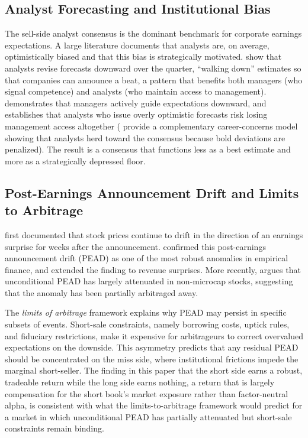 \documentclass[11pt]{article}
\begin{document}
\subsection{Analyst Forecasting and Institutional Bias}

The sell-side analyst consensus is the dominant benchmark for corporate earnings expectations. A large literature documents that analysts are, on average, optimistically biased and that this bias is strategically motivated. \citet{richardson2004walk} show that analysts revise forecasts downward over the quarter, ``walking down'' estimates so that companies can announce a beat, a pattern that benefits both managers (who signal competence) and analysts (who maintain access to management). \citet{matsumoto2002management} demonstrates that managers actively guide expectations downward, and \citet{ke2006effect} establishes that analysts who issue overly optimistic forecasts risk losing management access altogether (\citet{hong2000security} provide a complementary career-concerns model showing that analysts herd toward the consensus because bold deviations are penalized). The result is a consensus that functions less as a best estimate and more as a strategically depressed floor.

\subsection{Post-Earnings Announcement Drift and Limits to Arbitrage}

\citet{ball1968empirical} first documented that stock prices continue to drift in the direction of an earnings surprise for weeks after the announcement. \citet{bernard1989post} confirmed this post-earnings announcement drift (PEAD) as one of the most robust anomalies in empirical finance, and \citet{livnat2006comparing} extended the finding to revenue surprises. More recently, \citet{martineau2022pead} argues that unconditional PEAD has largely attenuated in non-microcap stocks, suggesting that the anomaly has been partially arbitraged away.

The \textit{limits of arbitrage} framework \citep{shleifer1997limits} explains why PEAD may persist in specific subsets of events. Short-sale constraints, namely borrowing costs, uptick rules, and fiduciary restrictions, make it expensive for arbitrageurs to correct overvalued expectations on the downside. This asymmetry predicts that any residual PEAD should be concentrated on the miss side, where institutional frictions impede the marginal short-seller. The finding in this paper that the short side earns a robust, tradeable return while the long side earns nothing, a return that is largely compensation for the short book's market exposure rather than factor-neutral alpha, is consistent with what the limits-to-arbitrage framework would predict for a market in which unconditional PEAD has partially attenuated but short-sale constraints remain binding.
\end{document}
